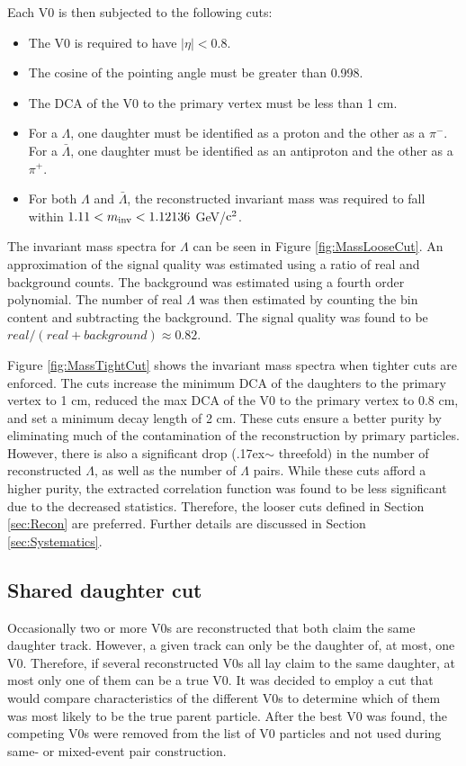 Each V0 is then subjected to the following cuts:
\begin{itemize}
\item The V0 is required to have $|\eta| < 0.8$.
\item The cosine of the pointing angle must be greater than 0.998.
\item The DCA of the V0 to the primary vertex must be less than 1 cm.
\item For a $\Lambda$, one daughter must be identified as a proton and the other as a $\pi^-$.  For a $\bar{\Lambda}$, one daughter must be identified as an antiproton and the other as a $\pi^+$.
\item For both $\Lambda$ and $\bar{\Lambda}$, the reconstructed invariant mass was required to fall within $ 1.11 < m_{\rm inv} < 1.12136$ GeV/${\rm c^2}$.
\end{itemize}

The invariant mass spectra for $\Lambda$ can be seen in Figure \ref{fig:MassLooseCut}. An approximation of the signal quality was estimated using a ratio of real and background counts.  The background was estimated using a fourth order polynomial.  The number of real $\Lambda$ was then estimated by counting the bin content and subtracting the background. The signal quality was found to be $real/(real + background) \approx 0.82$.

Figure \ref{fig:MassTightCut} shows the invariant mass spectra when tighter cuts are enforced.  The cuts increase the minimum DCA of the daughters to the primary vertex to 1 cm, reduced the max DCA of the V0 to the primary vertex to 0.8 cm, and set a minimum decay length of 2 cm.  These cuts ensure a better purity by eliminating much of the contamination of the reconstruction by primary particles.  However, there is also a significant drop ({\raise.17ex\hbox{$\scriptstyle\mathtt{\sim}$}} threefold) in the number of reconstructed $\Lambda$, as well as the number of $\Lambda$ pairs.  While these cuts afford a higher purity, the extracted correlation function was found to be less significant due to the decreased statistics.  Therefore, the looser cuts defined in Section \ref{sec:Recon} are preferred.  Further details are discussed in Section \ref{sec:Systematics}.

\subsection{Shared daughter cut}

Occasionally two or more V0s are reconstructed that both claim the same daughter track.  However, a given track can only be the daughter of, at most, one V0.  Therefore, if several reconstructed V0s all lay claim to the same daughter, at most only one of them can be a true V0.  It was decided to employ a cut that would compare characteristics of the different V0s to determine which of them was most likely to be the true parent particle.  After the best V0 was found, the competing V0s were removed from the list of V0 particles and not used during same- or mixed-event pair construction.

